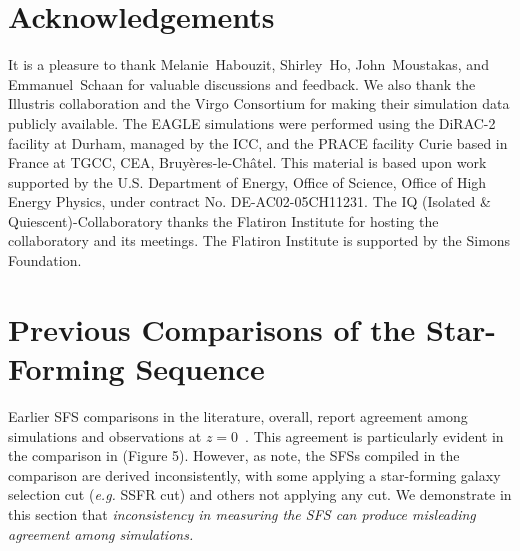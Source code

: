 \documentclass[tighten, preprint]{aastex62}
\begin{document}
\section*{Acknowledgements}
It is a pleasure to thank
	Melanie~Habouzit,
	Shirley~Ho, 
    John~Moustakas,
    and 
	Emmanuel~Schaan 
for valuable discussions and feedback.
We also thank the Illustris collaboration and the Virgo Consortium for making 
their simulation data publicly available. The EAGLE simulations were performed 
using the DiRAC-2 facility at Durham, managed by the ICC, and the PRACE facility 
Curie based in France at TGCC, CEA, Bruy\`{e}res-le-Ch\^{a}tel.
This material is based upon work supported by the U.S. Department
of Energy, Office of Science, Office of High Energy Physics, under
contract No. DE-AC02-05CH11231. The IQ (Isolated \& Quiescent)-Collaboratory thanks the Flatiron Institute for hosting the collaboratory 
and its meetings. The Flatiron Institute is supported by the Simons Foundation.
\appendix
{}

\section{Previous Comparisons of the Star-Forming Sequence} \label{app:literature}
Earlier SFS comparisons in the literature, overall, report agreement among 
simulations and observations at $z=0$~\citep[\emph{e.g.}][]{genel2014, somerville2015, sparre2015, schaye2015, bluck2016, dave2016}. 
This agreement is particularly evident in the comparison in 
\cite{somerville2015} (Figure 5). However, as \cite{somerville2015} note, 
the SFSs compiled in the comparison are derived inconsistently, with some 
applying a star-forming galaxy selection cut (\emph{e.g.} SSFR cut) and 
others not applying any cut. We demonstrate in this section that {\em inconsistency 
in measuring the SFS can produce misleading agreement among simulations.} 
\end{document}

